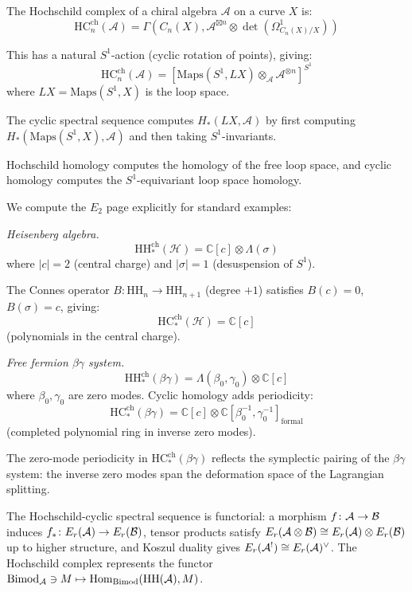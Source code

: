 \begin{construction}
The Hochschild complex of a chiral algebra $\mathcal{A}$ on a curve $X$ is:
\[\text{HC}_n^{\text{ch}}(\mathcal{A}) = \Gamma(C_n(X), 
   \mathcal{A}^{\boxtimes n} \otimes \det(\Omega^1_{C_n(X)/X}))\]

This has a natural $S^1$-action (cyclic rotation of points), giving:
\[\text{HC}_n^{\text{ch}}(\mathcal{A}) = 
   [\text{Maps}(S^1, LX) \otimes_{\mathcal{A}} \mathcal{A}^{\otimes n}]^{S^1}\]
where $LX = \text{Maps}(S^1, X)$ is the loop space.

The cyclic spectral sequence computes $H_*(LX, \mathcal{A})$ by first computing 
$H_*(\text{Maps}(S^1, X), \mathcal{A})$ and then taking $S^1$-invariants.

Hochschild homology computes the homology of the free loop space, and cyclic homology computes the $S^1$-equivariant loop space homology.
\end{construction}

\begin{computation}
We compute the $E_2$ page explicitly for standard examples:

\emph{Heisenberg algebra.}
\[\text{HH}_*^{\text{ch}}(\mathcal{H}) = \mathbb{C}[c] \otimes \Lambda(\sigma)\]
where $|c| = 2$ (central charge) and $|\sigma| = 1$ (desuspension of $S^1$).

The Connes operator $B: \text{HH}_n \to \text{HH}_{n+1}$ (degree $+1$) satisfies $B(c) = 0$,
$B(\sigma) = c$, giving:
\[\text{HC}_*^{\text{ch}}(\mathcal{H}) = \mathbb{C}[c]\]
(polynomials in the central charge).

\emph{Free fermion $\beta\gamma$ system.}
\[\text{HH}_*^{\text{ch}}(\beta\gamma) = \Lambda(\beta_0, \gamma_0) \otimes \mathbb{C}[c]\]
where $\beta_0, \gamma_0$ are zero modes. Cyclic homology adds periodicity:
\[\text{HC}_*^{\text{ch}}(\beta\gamma) = \mathbb{C}[c] \otimes 
   \mathbb{C}[\beta_0^{-1}, \gamma_0^{-1}]_{\text{formal}}\]
(completed polynomial ring in inverse zero modes).

The zero-mode periodicity in $\text{HC}_*^{\text{ch}}(\beta\gamma)$ reflects the symplectic pairing of the $\beta\gamma$ system: the inverse zero modes span the deformation space of the Lagrangian splitting.
\end{computation}

\begin{remark}[Functoriality]
The Hochschild-cyclic spectral sequence is functorial: a morphism
$f\colon \mathcal{A} \to \mathcal{B}$ induces $f_*\colon E_r(\mathcal{A}) \to E_r(\mathcal{B})$,
tensor products satisfy $E_r(\mathcal{A} \otimes \mathcal{B}) \cong E_r(\mathcal{A}) \otimes E_r(\mathcal{B})$
up to higher structure, and Koszul duality gives $E_r(\mathcal{A}^!) \cong E_r(\mathcal{A})^\vee$.
The Hochschild complex represents the functor
$\operatorname{Bimod}_{\mathcal{A}} \ni M \mapsto \operatorname{Hom}_{\operatorname{Bimod}}(\operatorname{HH}(\mathcal{A}), M)$.
\end{remark}

